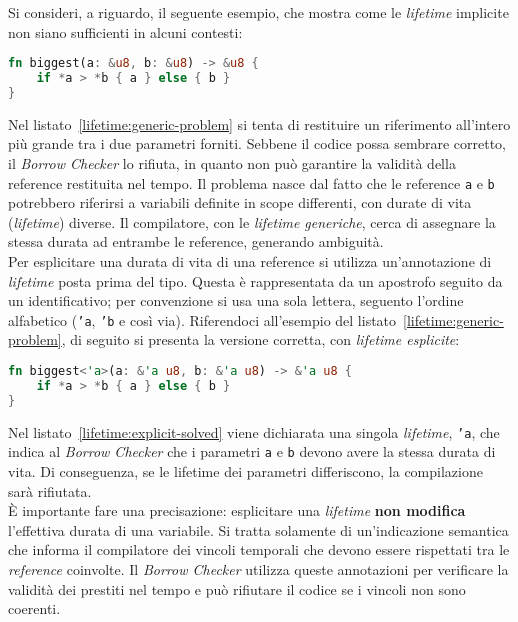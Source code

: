 Si consideri, a riguardo, il seguente esempio, che mostra come le \textit{lifetime} implicite non siano sufficienti in alcuni contesti:
\begin{lstlisting}[language=Rust, caption={Limitazione delle \textit{lifetime} generiche}, label={lifetime:generic-problem}]
fn biggest(a: &u8, b: &u8) -> &u8 {
    if *a > *b { a } else { b }
}
\end{lstlisting}
Nel listato~\ref{lifetime:generic-problem} si tenta di restituire un riferimento all'intero più grande tra i due parametri forniti. 
Sebbene il codice possa sembrare corretto, il \textit{Borrow Checker} lo rifiuta, in quanto non può garantire la validità della reference restituita nel tempo.
Il problema nasce dal fatto che le reference \texttt{a} e \texttt{b} potrebbero riferirsi a variabili definite in scope differenti, con durate di vita (\textit{lifetime}) diverse.
Il compilatore, con le \textit{lifetime generiche}, cerca di assegnare la stessa durata ad entrambe le reference, generando ambiguità. \hfill
\vspace{10pt}\\
\noindent Per esplicitare una durata di vita di una reference si utilizza un'annotazione di \textit{lifetime} posta prima del tipo. Questa è rappresentata da un apostrofo seguito da un identificativo; per convenzione si usa una sola lettera, seguento l'ordine alfabetico (\texttt{'a}, \texttt{'b} e così via).
Riferendoci all'esempio del listato~\ref{lifetime:generic-problem}, di seguito si presenta la versione corretta, con \textit{lifetime esplicite}:
\begin{lstlisting}[language=Rust, caption={\textit{Lifetime} esplicite}, label={lifetime:explicit-solved}]
fn biggest<'a>(a: &'a u8, b: &'a u8) -> &'a u8 {
    if *a > *b { a } else { b }
}
\end{lstlisting}
Nel listato~\ref{lifetime:explicit-solved} viene dichiarata una singola \textit{lifetime}, \texttt{'a}, che indica al \textit{Borrow Checker} che i parametri \texttt{a} e \texttt{b} devono avere la stessa durata di vita. Di conseguenza, se le lifetime dei parametri differiscono, la compilazione sarà rifiutata. \hfill
\vspace{10pt}\\
\noindent È importante fare una precisazione: esplicitare una \textit{lifetime} \textbf{non modifica} l'effettiva durata di una variabile. Si tratta solamente di un'indicazione semantica che informa il compilatore dei vincoli temporali che devono essere rispettati tra le \textit{reference} coinvolte. Il \textit{Borrow Checker} utilizza queste annotazioni per verificare la validità dei prestiti nel tempo e può rifiutare il codice se i vincoli non sono coerenti.

